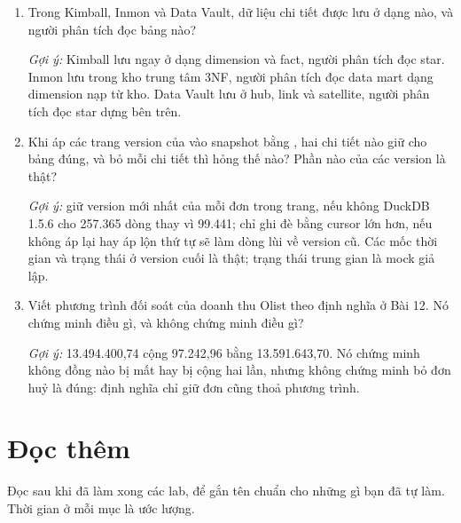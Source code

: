 \begin{enumerate}
  \item Trong Kimball, Inmon và Data Vault, dữ liệu chi tiết được lưu ở dạng nào, và người phân tích đọc bảng nào?\par
  \textit{Gợi ý:} Kimball lưu ngay ở dạng dimension và fact, người phân tích đọc star. Inmon lưu trong kho trung tâm 3NF, người phân tích đọc data mart dạng dimension nạp từ kho. Data Vault lưu ở hub, link và satellite, người phân tích đọc star dựng bên trên.
  \item Khi áp các trang version của  vào snapshot bằng , hai chi tiết nào giữ cho bảng đúng, và bỏ mỗi chi tiết thì hỏng thế nào? Phần nào của các version là thật?\par
  \textit{Gợi ý:} giữ version mới nhất của mỗi đơn trong trang, nếu không DuckDB 1.5.6 cho 257.365 dòng thay vì 99.441; chỉ ghi đè bằng cursor lớn hơn, nếu không áp lại hay áp lộn thứ tự sẽ làm dòng lùi về version cũ. Các mốc thời gian và trạng thái ở version cuối là thật; trạng thái trung gian là mock giả lập.
  \item Viết phương trình đối soát của doanh thu Olist theo định nghĩa ở Bài 12. Nó chứng minh điều gì, và không chứng minh điều gì?\par
  \textit{Gợi ý:} 13.494.400,74 cộng 97.242,96 bằng 13.591.643,70. Nó chứng minh không đồng nào bị mất hay bị cộng hai lần, nhưng không chứng minh bỏ đơn huỷ là đúng: định nghĩa chỉ giữ đơn  cũng thoả phương trình.
\end{enumerate}

\section{Đọc thêm}

Đọc sau khi đã làm xong các lab, để gắn tên chuẩn cho những gì bạn đã tự làm. Thời gian ở mỗi mục là ước lượng.


